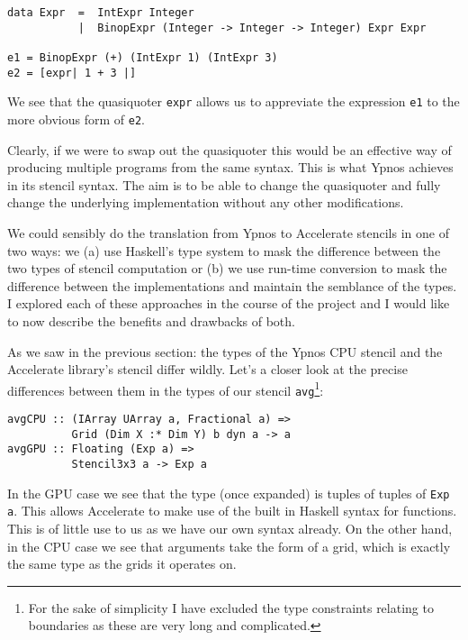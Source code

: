 \begin{verbatim}
data Expr  =  IntExpr Integer
           |  BinopExpr (Integer -> Integer -> Integer) Expr Expr

e1 = BinopExpr (+) (IntExpr 1) (IntExpr 3)
e2 = [expr| 1 + 3 |]
\end{verbatim}

We see that the quasiquoter \texttt{expr} allows us to appreviate the
expression \texttt{e1} to the more obvious form of \texttt{e2}.

Clearly, if we were to swap out the quasiquoter this would be an
effective way of producing multiple programs from the same syntax. This
is what Ypnos achieves in its stencil syntax. The aim is to be able to
change the quasiquoter and fully change the underlying implementation
without any other modifications.

We could sensibly do the translation from Ypnos to Accelerate stencils
in one of two ways: we (a) use Haskell's type system to mask the
difference between the two types of stencil computation or (b) we use
run-time conversion to mask the difference between the implementations
and maintain the semblance of the types. I explored each of these
approaches in the course of the project and I would like to now describe
the benefits and drawbacks of both.


As we saw in the previous section: the types of the Ypnos CPU stencil
and the Accelerate library's stencil differ wildly. Let's a closer look
at the precise differences between them in the types of our stencil
\texttt{avg}\footnote{For the sake of simplicity I have excluded the
  type constraints relating to boundaries as these are very long and
  complicated.}:

\begin{verbatim}
avgCPU :: (IArray UArray a, Fractional a) =>
          Grid (Dim X :* Dim Y) b dyn a -> a
avgGPU :: Floating (Exp a) =>
          Stencil3x3 a -> Exp a
\end{verbatim}

In the GPU case we see that the type (once expanded) is tuples of tuples
of \texttt{Exp a}. This allows Accelerate to make use of the built in
Haskell syntax for functions. This is of little use to us as we have our
own syntax already. On the other hand, in the CPU case we see that
arguments take the form of a grid, which is exactly the same type as the
grids it operates on.


